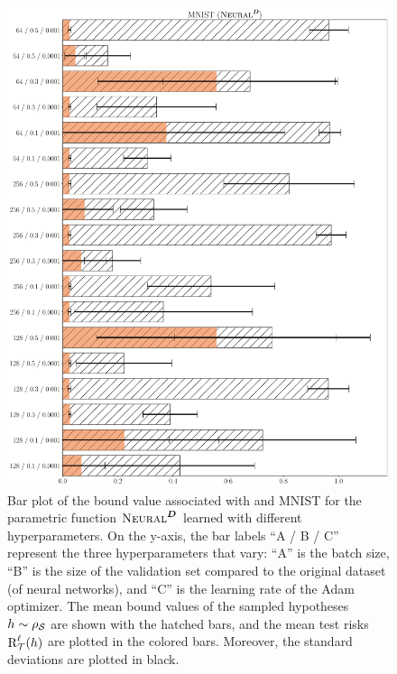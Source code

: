 \documentclass[twoside]{article}
\theoremstyle{plain}
\begin{document}
\begin{figure}
\centering
\includegraphics[width=0.9\linewidth]{figures/fig_7_dist_mnist.pdf}
\caption{
Bar plot of the bound value associated with  and MNIST for the parametric function $\text{\sc Neural}^{\boldsymbol{D}}$ learned with different hyperparameters.
On the y-axis, the bar labels ``A / B / C'' represent the three hyperparameters that vary: ``A'' is the batch size, ``B'' is the size of the validation set compared to the original dataset (of neural networks), and ``C'' is the learning rate of the Adam optimizer.
The mean bound values of the sampled hypotheses $h\sim\rho_{\mathcal{S}}$ are shown with the hatched bars, and the mean test risks $\text{R}^{\ell}_{\mathcal{T}}(h)$ are plotted in the colored bars.
Moreover, the standard deviations are plotted in black.
}
\label{fig:dist-neural-mnist}
\end{figure}
\end{document}
